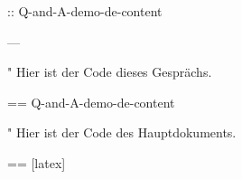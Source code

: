 \documentclass[%
  numbered question,
  numbered answer,
  scroll,
]{Q-and-A}
\begin{document}
:: {Q-and-A-demo-de-content}


---

"
  Hier ist der Code dieses Gesprächs.

  == {Q-and-A-demo-de-content}

"
  Hier ist der Code des Hauptdokuments.

  == [latex] {\jobname}
\end{document}

